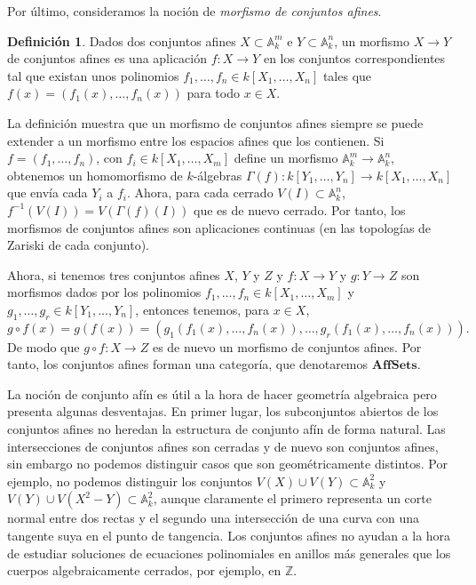 \documentclass[12pt,a4paper]{article}
\theoremstyle{definition} \newtheorem{defn}[thm]{Definición}
\theoremstyle{definition} \newtheorem{ejemplo}[thm]{Ejemplo}
\theoremstyle{definition} \newtheorem{ejercicio}[thm]{Ejercicio}
\theoremstyle{remark} \newtheorem*{obs}{Observación}
\def\AA{\mathbb{A}}
\def\ZZ{\mathbb{Z}}
\begin{document}
  Por último, consideramos la noción de \emph{morfismo de conjuntos afines}.
  \begin{defn}
    Dados dos conjuntos afines $X\subset \AA^m_k$ e $Y\subset \AA^n_k$, un morfismo $X\rightarrow Y$ de conjuntos afines es una aplicación $f:X\rightarrow Y$ en los conjuntos correspondientes tal que existan unos polinomios $f_1,\dots,f_n\in k[X_1,\dots,X_n]$ tales que $f(x)=(f_1(x),\dots,f_n(x))$ para todo $x\in X$.
\end{defn}

La definición muestra que un morfismo de conjuntos afines siempre se puede extender a un morfismo entre los espacios afines que los contienen. Si $f=(f_1,\dots,f_n)$, con $f_i \in k[X_1,\dots,X_m]$ define un morfismo $\AA^m_k\rightarrow \AA^n_k$, obtenemos un homomorfismo de $k$-álgebras $\Gamma(f):k[Y_1,\dots,Y_n] \rightarrow k[X_1,\dots,X_n]$ que envía cada $Y_i$ a $f_i$. Ahora, para cada cerrado $V(I)\subset \AA^n_k$, $f^{-1}(V(I))=V(\Gamma(f)(I))$ que es de nuevo cerrado. Por tanto, los morfismos de conjuntos afines son aplicaciones continuas (en las topologías de Zariski de cada conjunto).

Ahora, si tenemos tres conjuntos afines $X$, $Y$ y $Z$ y $f:X\rightarrow Y$ y $g:Y\rightarrow Z$ son morfismos dados por los polinomios $f_1,\dots,f_n\in k[X_1,\dots,X_m]$ y $g_1,\dots,g_r \in k[Y_1,\dots,Y_n]$, entonces tenemos, para $x\in X$,
\begin{equation*}
  g\circ f(x)=g(f(x))=(g_1(f_1(x),\dots,f_n(x)),\dots,g_r(f_1(x),\dots,f_n(x))).
\end{equation*}
De modo que $g\circ f:X\rightarrow Z$ es de nuevo un morfismo de conjuntos afines. Por tanto, los conjuntos afines forman una categoría, que denotaremos $\mathbf{AffSets}$.

La noción de conjunto afín es útil a la hora de hacer geometría algebraica pero presenta algunas desventajas. En primer lugar, los subconjuntos abiertos de los conjuntos afines no heredan la estructura de conjunto afín de forma natural. Las intersecciones de conjuntos afines son cerradas y de nuevo son conjuntos afines, sin embargo no podemos distinguir casos que son geométricamente distintos. Por ejemplo, no podemos distinguir los conjuntos $V(X)\cup V(Y) \subset \AA^2_k$ y $V(Y)\cup V(X^2-Y) \subset \AA^2_k$, aunque claramente el primero representa un corte normal entre dos rectas y el segundo una intersección de una curva con una tangente suya en el punto de tangencia. Los conjuntos afines no ayudan a la hora de estudiar soluciones de ecuaciones polinomiales en anillos más generales que los cuerpos algebraicamente cerrados, por ejemplo, en $\ZZ$. 
\end{document}
